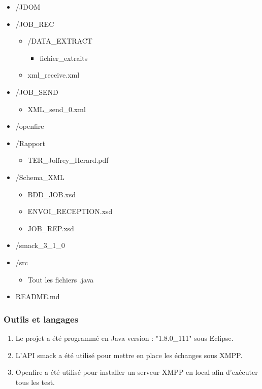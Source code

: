 \documentclass[11pt]{article}
\begin{document}
\begin{itemize}
\begin{itemize}
		\item /JDOM  
		\item /JOB\_REC \begin{itemize}\item /DATA\_EXTRACT \begin{itemize} \item fichier\_extraits\end{itemize}\item xml\_receive.xml  \end{itemize}
		\item /JOB\_SEND \begin{itemize}\item XML\_send\_0.xml \end{itemize}
		\item /openfire
		\item /Rapport \begin{itemize}\item TER\_Joffrey\_Herard.pdf  \end{itemize} 
		\item /Schema\_XML \begin{itemize}\item BDD\_JOB.xsd \item ENVOI\_RECEPTION.xsd \item JOB\_REP.xsd \end{itemize}
		\item /smack\_3\_1\_0
		\item /src \begin{itemize}\item Tout les fichiers .java \end{itemize}
		\item README.md 
\end{itemize}

\end{itemize}
\newpage
\subsubsection{Outils et langages} 
\begin{enumerate}
\item Le projet a été programmé en Java version : "1.8.0\_111" sous Eclipse.
\item L'API smack a été utilisé pour mettre en place les échanges sous XMPP.
\item Openfire a été utilisé pour installer un serveur XMPP en local afin d'exécuter tous les test.
\end{enumerate}
\newpage
\end{document}

